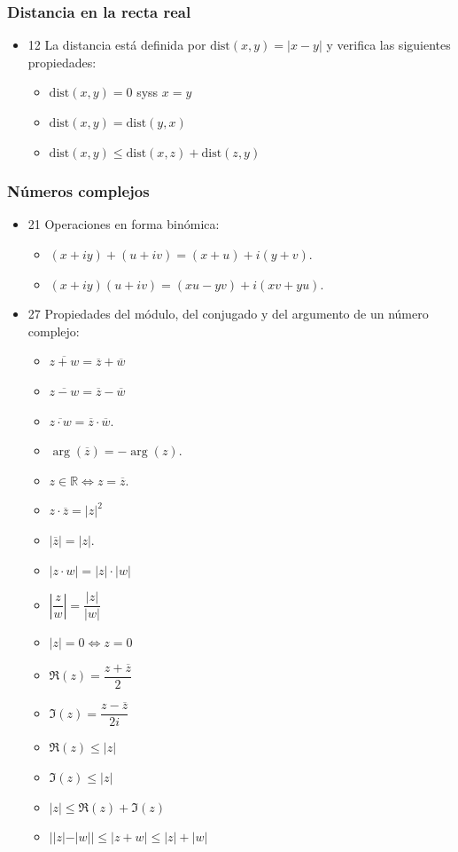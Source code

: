 \documentclass[11pt]{article}
\begin{document}
\subsubsection{Distancia en la recta real}
\label{sec:org68e0f9f}

\begin{itemize}
\item 12 La distancia está definida por \(\mbox{dist}(x,y) = |x - y|\) y
verifica las siguientes propiedades:
\begin{itemize}
\item \(\mbox{dist}(x,y) = 0\) syss \(x = y\)
\item \(\mbox{dist}(x,y) = \mbox{dist}(y,x)\)
\item \(\mbox{dist}(x,y) \leq \mbox{dist}(x,z) + \mbox{dist}(z,y)\)
\end{itemize}
\end{itemize}

\subsubsection{Números complejos}
\label{sec:org0b88f70}

\begin{itemize}
\item 21 Operaciones en forma binómica:
\begin{itemize}
\item \((x + iy) + (u + iv) = (x + u) + i(y + v)\).
\item \((x + iy) (u + iv) = (xu - yv) + i(xv + yu)\).
\end{itemize}

\item 27 Propiedades del módulo, del conjugado y del argumento de un número
complejo:
\begin{itemize}
\item \(\overline{z+w} = \overline{z} + \overline{w}\)
\item \(\overline{z-w} = \overline{z} - \overline{w}\)
\item \(\overline{z \cdot w} = \overline{z} \cdot \overline{w}\).
\item \(\arg({\overline{z}}) = -\arg({z})\).
\item \(z \in \mathbb{R} \iff z = \overline{z}\).
\item \(z \cdot \overline{z} = |z|^{2}\)
\item \(|\overline{z}| = |z|\).
\item \(|z \cdot w| = |z| \cdot |w|\)
\item \(\left|\dfrac{z}{w}\right| = \dfrac{|z|}{|w|}\)
\item \(|z| = 0 \iff z = 0\)
\item \(\Re(z) = \dfrac{z + \overline{z}}{2}\)
\item \(\Im(z) = \dfrac{z - \overline{z}}{2i}\)
\item \(\Re(z) \leq |z|\)
\item \(\Im(z) \leq |z|\)
\item \(|z| \leq \Re(z) + \Im(z)\)
\item \(||z| - |w|| \leq |z + w| \leq |z| + |w|\)
\end{itemize}
\end{itemize}
\end{document}
